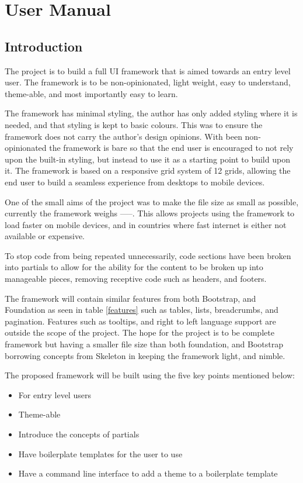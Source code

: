 \newpage
\chapter*{User Manual}
\section*{Introduction}

The project is to build a full \gls{UI} framework that is aimed towards an entry level user. The framework is to be non-opinionated, light weight, easy to understand, theme-able, and most importantly easy to learn.

The framework has minimal styling, the author has only added styling where it is needed, and that styling is kept to basic colours. This was to ensure the framework does not carry the author's design opinions. With been non-opinionated the framework is bare so that the end user is encouraged to not rely upon the built-in styling, but instead to use it as a starting point to build upon it. The framework is based on a responsive grid system of 12 grids, allowing the end user to build a seamless experience from desktops to mobile devices.

One of the small aims of the project was to make the file size as small as possible, currently the framework weighs -----. This allows projects using the framework to load faster on mobile devices, and in countries where fast internet is either not available or expensive. 

To stop code from being repeated unnecessarily, code sections have been broken into partials to allow for the ability for the content to be broken up into manageable pieces, removing receptive code such as headers, and footers.

\newpage
The framework will contain similar features from both Bootstrap, and Foundation as seen in table \ref{features} such as tables, lists, breadcrumbs, and pagination. Features such as tooltips, and right to left language support are outside the scope of the project. The hope for the project is to be complete framework but having a smaller file size than both foundation, and Bootstrap borrowing concepts from Skeleton in keeping the framework light, and nimble. 

The proposed framework will be built using the five key points mentioned below: 
\begin{itemize}
	\item For entry level users
	\item Theme-able
	\item Introduce the concepts of partials
	\item Have boilerplate templates for the user to use
	\item Have a command line interface to add a theme to a boilerplate template
\end{itemize}
